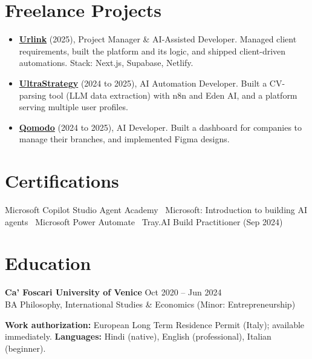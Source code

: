 \documentclass[a4paper,10pt]{article}
\begin{document}
\section{Freelance Projects}
\begin{itemize}
 \item \textbf{\href{https://smarturlink.com/}{Urlink}} (2025), Project Manager \& AI-Assisted Developer. Managed client requirements, built the platform and its logic, and shipped client-driven automations. Stack: Next.js, Supabase, Netlify.
 \item \textbf{\href{https://ultrastrategy.com}{UltraStrategy}} (2024 to 2025), AI Automation Developer. Built a CV-parsing tool (LLM data extraction) with n8n and Eden AI, and a platform serving multiple user profiles.
 \item \textbf{\href{https://www.qomodo.me/}{Qomodo}} (2024 to 2025), AI Developer. Built a dashboard for companies to manage their branches, and implemented Figma designs.
\end{itemize}

\section{Certifications}
Microsoft Copilot Studio Agent Academy \textbullet\ Microsoft: Introduction to building AI agents \textbullet\ Microsoft Power Automate \textbullet\ Tray.AI Build Practitioner (Sep 2024)

\section{Education}
\textbf{Ca' Foscari University of Venice} \hfill Oct 2020 -- Jun 2024\\
BA Philosophy, International Studies \& Economics (Minor: Entrepreneurship)

\vspace{2pt}
{\small \textbf{Work authorization:} European Long Term Residence Permit (Italy); available immediately. \quad \textbf{Languages:} Hindi (native), English (professional), Italian (beginner).}
\end{document}
